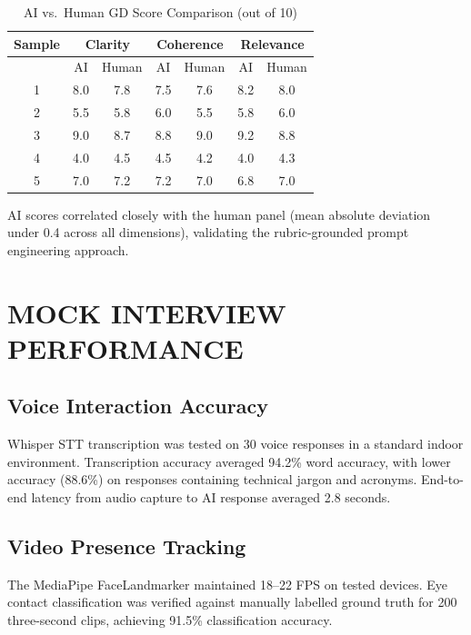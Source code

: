 \documentclass[12pt,a4paper]{report}
\begin{document}
\begin{table}[H]
    \centering
    \caption{AI vs.\ Human GD Score Comparison (out of 10)}
    \label{tab:gdresult}
    \begin{tabular}{|c|c|c|c|c|c|c|}
        \hline
        \textbf{Sample} & \multicolumn{2}{c|}{\textbf{Clarity}} & \multicolumn{2}{c|}{\textbf{Coherence}} & \multicolumn{2}{c|}{\textbf{Relevance}} \\
        \hline
        & AI & Human & AI & Human & AI & Human \\
        \hline
        1 & 8.0 & 7.8 & 7.5 & 7.6 & 8.2 & 8.0 \\
        2 & 5.5 & 5.8 & 6.0 & 5.5 & 5.8 & 6.0 \\
        3 & 9.0 & 8.7 & 8.8 & 9.0 & 9.2 & 8.8 \\
        4 & 4.0 & 4.5 & 4.5 & 4.2 & 4.0 & 4.3 \\
        5 & 7.0 & 7.2 & 7.2 & 7.0 & 6.8 & 7.0 \\
        \hline
    \end{tabular}
\end{table}

AI scores correlated closely with the human panel (mean absolute deviation under 0.4 across all dimensions), validating the rubric-grounded prompt engineering approach.

\section{MOCK INTERVIEW PERFORMANCE}

\subsection{Voice Interaction Accuracy}

Whisper STT transcription was tested on 30 voice responses in a standard indoor environment. Transcription accuracy averaged 94.2\% word accuracy, with lower accuracy (88.6\%) on responses containing technical jargon and acronyms. End-to-end latency from audio capture to AI response averaged 2.8 seconds.

\subsection{Video Presence Tracking}

The MediaPipe FaceLandmarker maintained 18--22 FPS on tested devices. Eye contact classification was verified against manually labelled ground truth for 200 three-second clips, achieving 91.5\% classification accuracy.
\end{document}
